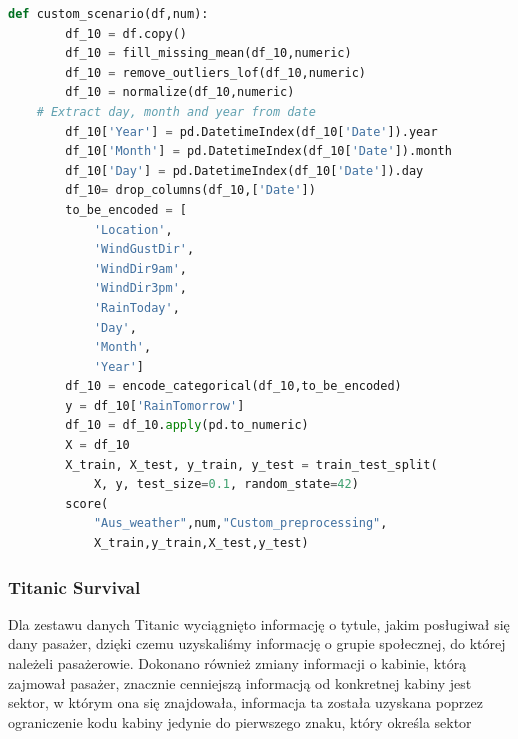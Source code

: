 \documentclass{article}
\begin{document}
\begin{lstlisting}[language=Python, caption={Indywidualny scenariusz dla zestawu danych Aus Weather}, captionpos=b]
    def custom_scenario(df,num):
        df_10 = df.copy()
        df_10 = fill_missing_mean(df_10,numeric)
        df_10 = remove_outliers_lof(df_10,numeric)
        df_10 = normalize(df_10,numeric)
    # Extract day, month and year from date
        df_10['Year'] = pd.DatetimeIndex(df_10['Date']).year
        df_10['Month'] = pd.DatetimeIndex(df_10['Date']).month
        df_10['Day'] = pd.DatetimeIndex(df_10['Date']).day
        df_10= drop_columns(df_10,['Date'])
        to_be_encoded = [
            'Location',
            'WindGustDir',
            'WindDir9am',
            'WindDir3pm',
            'RainToday',
            'Day',
            'Month',
            'Year']
        df_10 = encode_categorical(df_10,to_be_encoded)
        y = df_10['RainTomorrow']
        df_10 = df_10.apply(pd.to_numeric)
        X = df_10
        X_train, X_test, y_train, y_test = train_test_split(
            X, y, test_size=0.1, random_state=42)
        score(
            "Aus_weather",num,"Custom_preprocessing",
            X_train,y_train,X_test,y_test)
\end{lstlisting}

\subsubsection{Titanic Survival}
Dla zestawu danych Titanic wyciągnięto informację o tytule, jakim posługiwał się dany pasażer, 
dzięki czemu uzyskaliśmy informację o grupie społecznej, 
do której należeli pasażerowie. Dokonano również zmiany informacji o kabinie, którą zajmował pasażer, 
znacznie cenniejszą informacją od konkretnej kabiny jest sektor, w którym ona się znajdowała, 
informacja ta została uzyskana poprzez ograniczenie kodu kabiny jedynie do pierwszego znaku, który określa sektor
\end{document}

